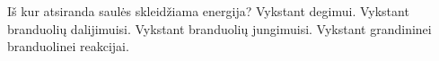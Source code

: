 Iš kur atsiranda saulės skleidžiama energija?
Vykstant degimui.
Vykstant branduolių dalijimuisi.
Vykstant branduolių jungimuisi.
Vykstant grandininei branduolinei reakcijai.
